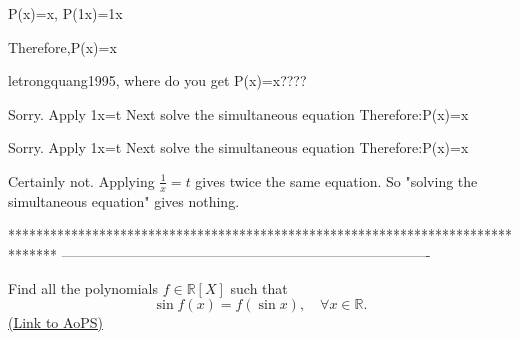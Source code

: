 \begin{solution}
	P(x)=x,        P(1\/x)=1\/x

Therefore,P(x)=x
\end{solution}



\begin{solution}
	letrongquang1995, where do you get P(x)=x????
\end{solution}



\begin{solution}
	Sorry.
Apply 1\/x=t
Next solve the simultaneous equation
Therefore:P(x)=x
\end{solution}



\begin{solution}
	\begin{tcolorbox}Sorry.
Apply 1\/x=t
Next solve the simultaneous equation
Therefore:P(x)=x\end{tcolorbox}
Certainly not.
Applying $\frac 1x=t$ gives twice the same equation.
So "solving the simultaneous equation" gives nothing.
\end{solution}
*******************************************************************************
-------------------------------------------------------------------------------

\begin{problem}
	Find all the polynomials $f\in \mathbb{R}[X]$ such that
\[\sin f(x)=f(\sin x),\quad \forall x\in \mathbb{R}.\]
	\flushright \href{https://artofproblemsolving.com/community/c6h392115}{(Link to AoPS)}
\end{problem}



